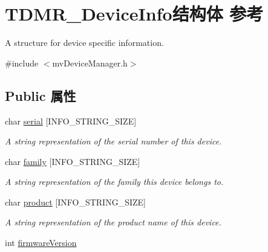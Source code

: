 \hypertarget{struct_t_d_m_r___device_info}{\section{T\+D\+M\+R\+\_\+\+Device\+Info结构体 参考}
\label{struct_t_d_m_r___device_info}
}


A structure for device specific information.  




{\ttfamily \#include $<$mv\+Device\+Manager.\+h$>$}

\subsection*{Public 属性}
\begin{DoxyCompactItemize}
\item 
\hypertarget{struct_t_d_m_r___device_info_a68fa6f486bf5adb0c80c1ac138c92806}{char \hyperlink{struct_t_d_m_r___device_info_a68fa6f486bf5adb0c80c1ac138c92806}{serial} \mbox{[}I\+N\+F\+O\+\_\+\+S\+T\+R\+I\+N\+G\+\_\+\+S\+I\+Z\+E\mbox{]}}\label{struct_t_d_m_r___device_info_a68fa6f486bf5adb0c80c1ac138c92806}

\begin{DoxyCompactList}\small\item\em A string representation of the serial number of this device. \end{DoxyCompactList}\item 
\hypertarget{struct_t_d_m_r___device_info_a3ff4c5fbbcc7b18bb9acdba31366854e}{char \hyperlink{struct_t_d_m_r___device_info_a3ff4c5fbbcc7b18bb9acdba31366854e}{family} \mbox{[}I\+N\+F\+O\+\_\+\+S\+T\+R\+I\+N\+G\+\_\+\+S\+I\+Z\+E\mbox{]}}\label{struct_t_d_m_r___device_info_a3ff4c5fbbcc7b18bb9acdba31366854e}

\begin{DoxyCompactList}\small\item\em A string representation of the family this device belongs to. \end{DoxyCompactList}\item 
\hypertarget{struct_t_d_m_r___device_info_a0bcff7180ca2eea0409c6719de4e3e22}{char \hyperlink{struct_t_d_m_r___device_info_a0bcff7180ca2eea0409c6719de4e3e22}{product} \mbox{[}I\+N\+F\+O\+\_\+\+S\+T\+R\+I\+N\+G\+\_\+\+S\+I\+Z\+E\mbox{]}}\label{struct_t_d_m_r___device_info_a0bcff7180ca2eea0409c6719de4e3e22}

\begin{DoxyCompactList}\small\item\em A string representation of the product name of this device. \end{DoxyCompactList}\item 
\hypertarget{struct_t_d_m_r___device_info_aa70a9706ddb60eb26acf61c6c59f36de}{int \hyperlink{struct_t_d_m_r___device_info_aa70a9706ddb60eb26acf61c6c59f36de}{firmware\+Version}}\label{struct_t_d_m_r___device_info_aa70a9706ddb60eb26acf61c6c59f36de}


\end{DoxyCompactItemize}
